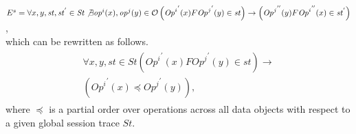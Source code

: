 \documentclass{sig-alternate-05-2015}
\begin{document}
  \\ $E^s = \forall x, y, \mathit{st}, \mathit{st}^{'} \in \mathit{St} \not\exists {\mathit{op}^i}(x), {\mathit{op}^j}(y) \in \mathcal{O} \\
 \left( {\mathit{Op}^i}^{'}(x) F {\mathit{Op}^j}^{'} (y) \in \mathit{st} \right) \rightarrow \left( {\mathit{Op}^j}^{''}(y) F {\mathit{Op}^i}^{''} (x) \in \mathit{st}^{'} \right)$,   \\
 which can be rewritten as follows.
 \begin{align}\label{eqn:PC}
\begin{split}
\forall x, y, \mathit{st} \in \mathit{St}  \left( {\mathit{Op}^i}^{'}(x) F {\mathit{Op}^j}^{'} (y) \in \mathit{st} \right) \rightarrow \\ \left( {\mathit{Op}^i}^{'}(x) \preccurlyeq {\mathit{Op}^j}^{'} (y) \right),
\end{split}
  \end{align}  where $ \preccurlyeq$ is a partial order over operations across all data objects with respect to a given global session trace $ \mathit{St}$.
\end{document}
